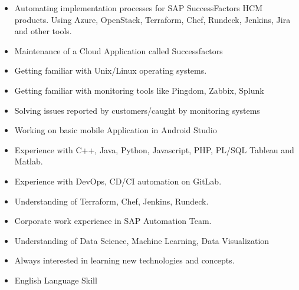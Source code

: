 \documentclass[10pt,a4paper,ragged2e,withhyper]{altacv}
\begin{document}
\begin{paracol}{2}


\begin{itemize}
\item Automating implementation processes for SAP SuccessFactors HCM products. Using Azure, OpenStack, Terraform, Chef, Rundeck, Jenkins, Jira and other tools. 
\end{itemize}
\divider

\begin{itemize}
\item Maintenance of a Cloud Application called Successfactors
\item Getting familiar with Unix/Linux operating systems.
\item Getting familiar with monitoring tools like Pingdom, Zabbix, Splunk
\item Solving issues reported by customers/caught by monitoring systems 
\end{itemize}
\divider

\begin{itemize}
\item Working on basic mobile Application in Android Studio
\end{itemize}

\divider


\begin{itemize}
\item Experience with C++, Java, Python, Javascript, PHP, PL/SQL Tableau and Matlab.
\item Experience with DevOps, CD/CI automation on GitLab.
\item Understanding of Terraform, Chef, Jenkins, Rundeck.
\item Corporate work experience in SAP Automation Team.
\item Understanding of Data Science, Machine Learning, Data Visualization
\item Always interested in learning new technologies and concepts. 
\item English Language Skill
\end{itemize}


\end{paracol}
\end{document}
